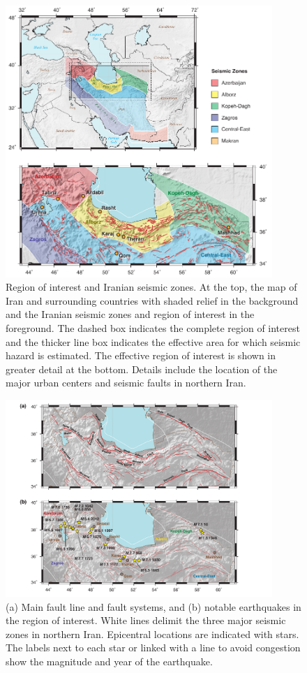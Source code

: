 
\begin{figure}[t] 
	\centering
	\includegraphics[width=0.9\textwidth]{figures/pdf/figure-01}
	\caption{Region of interest and Iranian seismic zones. At the top, the map of Iran and surrounding countries with shaded relief in the background and the Iranian seismic zones \citep[after][]{Karimiparidari2013} and region of interest in the foreground. The dashed box indicates the complete region of interest and the thicker line box indicates the effective area for which seismic hazard is estimated. The effective region of interest is shown in greater detail at the bottom. Details include the location of the major urban centers and seismic faults in northern Iran.}
	\label{fig:iran}
\end{figure}

\begin{figure}[t] 
	\centering
	\includegraphics[width=0.9\textwidth]{figures/pdf/figure-02}
	\caption{(a) Main fault line and fault systems, and (b) notable earthquakes in the region of interest. White lines delimit the three major seismic zones in northern Iran. Epicentral locations are indicated with stars. The labels next to each star or linked with a line to avoid congestion show the magnitude and year of the earthquake.}
	\label{fig:selected}
\end{figure}

